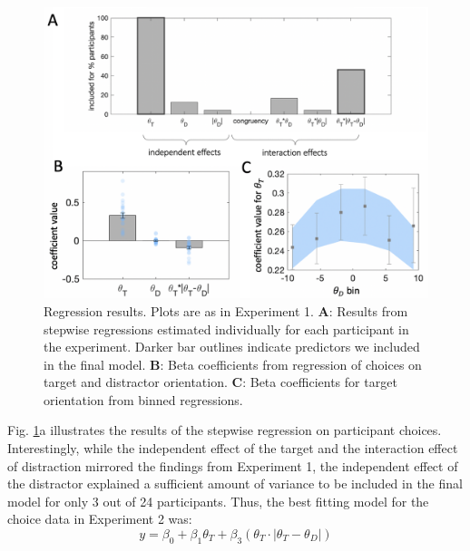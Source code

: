 \documentclass[a4paper, nobind]{templates/ociamthesis}
\begin{document}
\begin{figure}

{\centering \includegraphics[width=1\linewidth]{figures/distr-regr-b} 

}

\caption[Experiment 2, Regression results]{Regression results. Plots are as in Experiment 1. $\textbf{A:}$ Results from stepwise regressions estimated individually for each participant in the experiment. Darker bar outlines indicate predictors we included in the final model. $\textbf{B:}$ Beta coefficients from regression of choices on target and distractor orientation. $\textbf{C:}$ Beta coefficients for target orientation from binned regressions.}\label{fig:distr-regr-b}
\end{figure}

Fig. \ref{fig:distr-regr-b}a illustrates the results of the stepwise regression on participant choices. Interestingly, while the independent effect of the target and the interaction effect of distraction mirrored the findings from Experiment 1, the independent effect of the distractor explained a sufficient amount of variance to be included in the final model for only 3 out of 24 participants. Thus, the best fitting model for the choice data in Experiment 2 was:
\begin{equation}
y = \beta_0 + \beta_1\theta_T + \beta_3(\theta_T\cdot|\theta_T-\theta_D|)
\label{eq:reg-stepwise-b}
\end{equation}
\end{document}
